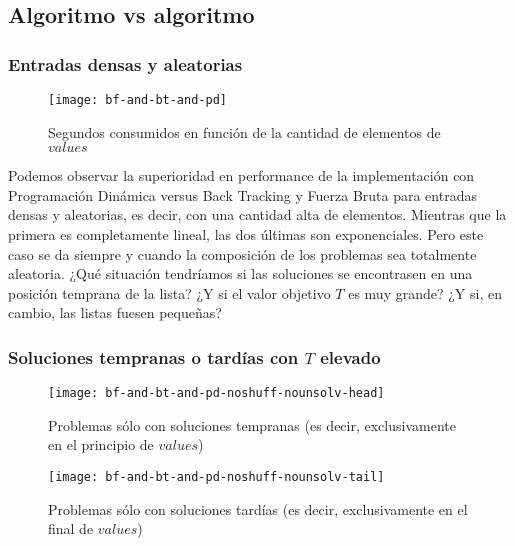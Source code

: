 \subsection{Algoritmo vs algoritmo}
\subsubsection{Entradas densas y aleatorias}
\begin{figure}[H]
	\centering
	\texttt{[image: bf-and-bt-and-pd]}
	\caption{\footnotesize Segundos consumidos en función de la cantidad de elementos de $values$}
	\label{fig:bf-and-bt-and-pd}
\end{figure}

Podemos observar la superioridad en performance de la implementación con Programación Dinámica versus Back Tracking y Fuerza Bruta para entradas densas y aleatorias, es decir, con una cantidad alta de elementos. Mientras que la primera es completamente lineal, las dos últimas son exponenciales. Pero este caso se da siempre y cuando la composición de los problemas sea totalmente aleatoria. ¿Qué situación tendríamos si las soluciones se encontrasen en una posición temprana de la lista? ¿Y si el valor objetivo $T$ es muy grande? ¿Y si, en cambio, las listas fuesen pequeñas?

\subsubsection{Soluciones tempranas o tardías con $T$ elevado}
\begin{figure}[H]
	\centering
	\begin{minipage}{0.48\textwidth}
		\centering
		\texttt{[image: bf-and-bt-and-pd-noshuff-nounsolv-head]}
		\caption{\footnotesize Problemas sólo con soluciones tempranas (es decir, exclusivamente en el principio de $values$)}
		\label{fig:bf-and-bt-and-pd-noshuff-nounsolv-head}
	\end{minipage}%
	\hspace{0.03\textwidth}
	\begin{minipage}{0.48\textwidth}
		\centering
		\texttt{[image: bf-and-bt-and-pd-noshuff-nounsolv-tail]}
		\caption{\footnotesize Problemas sólo con soluciones tardías (es decir, exclusivamente en el final de $values$)}
		\label{fig:bf-and-bt-and-pd-noshuff-nounsolv-tail}
	\end{minipage}%
\end{figure}

